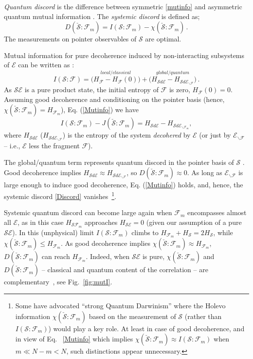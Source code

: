 \documentclass[aps,prl,showpacs,amsmath,amssymb,amsfonts,lengthcheck,twocolumn,longbibliography,superscriptaddress]{revtex4-2}
\newcommand{\cS}        {{\mathcal S}}
\newcommand{\cE}        {{\mathcal E}}
\newcommand{\+}         {\dagger}
\newcommand\cF{{\mathcal F}}
\newcommand{\mc}[1]{\mathcal{#1}}
\begin{document}
{\it Quantum discord} is the difference between symmetric \eqref{mutinfo} and asymmetric quantum mutual information \cite{Ollivier2001PRL,Henderson2001JPA,Giorda2010PRL,Shi2011JPA,Zwolak2013SR,ZRZ2016SR,Brodutch2011JPCS,Adesso2016,Bera2017RPP,discordc1}. The \emph{systemic discord} is defined as;
\begin{equation}
D(\check{\mc{S}}:\mc{F}_m) = I({\mc{S}}:\mc{F}_m)  - \chi (\check \cS:\mc{F}_m)  \,.
\label{Discord}
\end{equation}
The measurements on pointer observables of $\mc{S}$ are optimal. 

Mutual information for pure decoherence induced by non-interacting subsystems of $\cE$ can be written as \cite{ZQZ10,Z07b}:
\begin{equation}
I(\cS:\cF)=\stackrel {local/classical} {\bigl(H_\cF-H_\cF(0)\bigr)} + \stackrel {global/quantum} {\bigl(H_{\cS d \cE} - H_{\cS d \cE_{\backslash\cF}}\bigr)}\,.
\label{4.20}
\end{equation}
As $\cS\cE$ is a pure product state, the initial entropy of $\mc{F}$ is zero, $H_\cF(0)=0$. Assuming good decoherence and conditioning on the pointer basis (hence, 
$\chi(\check \cS :\mc{F}_m)=H_{\mc{F}_m}$), Eq. (\ref{Mutinfo}) we have
\begin{equation}
I({\mc{S}}:{\mc{F}}_m) - J(\check \cS : {\mc{F}}_m) = H_{\cS d \cE} - H_{\cS d \cE_{\backslash{\cF}_m}},
\label{discord}
\end{equation}
where $H_{\cS d \cE}$ ($H_{\cS d \cE_{\backslash\cF}}$) is the entropy of the system \textit{decohered} by $\cE$ (or just by $\cE_{\backslash\cF}$ -- i.e., $\cE$ less the fragment $\cF$).   

The global/quantum term represents quantum discord  in the pointer basis of $\cS$ \cite{ZQZ10}. Good decoherence implies $H_{\cS d \cE} \approx H_{\cS d \cE_{\backslash\cF}}$, so $D(\check{\mc{S}}:\mc{F}_m) \approx 0$. As long as $\cE_{\backslash\cF}$ is large enough to induce good decoherence, Eq. (\ref{Mutinfo}) holds, and, hence,  the systemic discord \eqref{Discord} vanishes~\footnote{Some have advocated ``strong Quantum Darwinism'' \cite{LeCastro} where the Holevo information  $\chi (\check \cS:\mc{F}_m)$ based on the measurement of $\cS$ (rather than $I({\mc{S}}:\mc{F}_m)$) would play a key role.  At least in case of good decoherence, and in view of Eq. ~\eqref{Mutinfo} which implies $\chi (\check \cS: \mc{F}_m) \approx I({\mc{S}}:\mc{F}_m)$ when $m \ll N - m<N$, such distinctions appear unnecessary.}.

Systemic quantum discord can become large again when $\cF_m$ encompasses almost all $\cE$, as in this case $H_{\cS \cF_m}$ approaches $H_{\cS \cE}=0$ (given our assumption of a pure $\cS \cE$). In this (unphysical) limit $I(\cS : \cF_m)$ climbs to $H_{\cF_m} + H_\cS = 2 H_{\cS}$, while $\chi (\check \cS:\mc{F}_m) \leq H_{\cF_m}$. As good decoherence implies $\chi (\check \cS:{\mc{F}}_m) \approx H_{\cF_m}$, $D(\check {\mc{S}}:\mc{F}_m)$ can reach $H_{\cF_m}$. Indeed, when $\cS\cE$ is pure, $\chi (\check \cS: \mc{F}_m)$ and $D(\check{\mc{S}}:\mc{F}_m)$ -- classical and quantum content of the correlation -- are complementary~\cite{Zwolak2013SR},  see Fig.~\ref{fig:mutI}.
\end{document}
